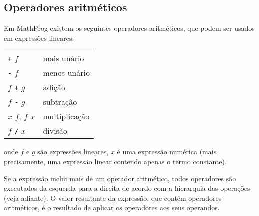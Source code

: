 \documentclass[11pt, brazil]{report}
\begin{document}
%
%

\subsection{Operadores aritméticos}

Em MathProg existem os seguintes operadores aritméticos, que podem ser
usados em expressões lineares:


\begin{tabular}{@{}ll@{}}
{\tt+} $f$&mais unário\\
{\tt-} $f$&menos unário\\
$f$ {\tt+} $g$&adição\\
$f$ {\tt-} $g$&subtração\\
$x$ {\tt*} $f$, $f$ {\tt*} $x$&multiplicação\\
$f$ {\tt/} $x$&divisão
\end{tabular}


\noindent onde $f$ e $g$ são expressões lineares, $x$ é uma expressão
numérica (mais precisamente, uma expressão linear contendo apenas o termo
constante).

Se a expressão inclui mais de um operador aritmético, todos
operadores são executados da esquerda para a direita de acordo com a hierarquia
das operações (veja adiante). O valor resultante da expressão, que
contém operadores aritméticos, é o resultado de aplicar os operadores aos
seus operandos.
\end{document}
